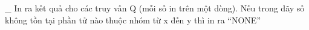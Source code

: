 \_ In ra kết quả cho các truy vấn Q (mỗi số in trên một dòng). Nếu trong dãy số không tồn tại phần tử nào thuộc nhóm từ x đến y thì in ra “NONE”  

\